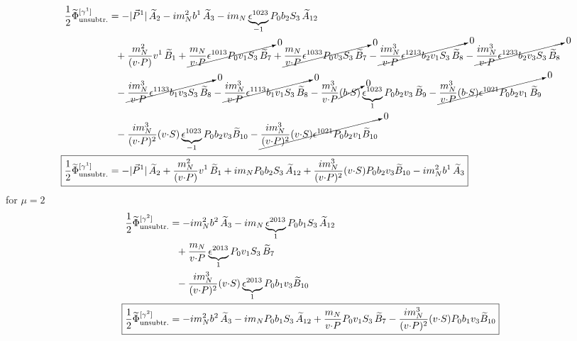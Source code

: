 \documentclass[]{article}
\numberwithin{equation}{section}
\newcommand{\tcdot}{{\cdot}}
\newcommand{\tAmp}{\widetilde{A}}
\newcommand{\tBmp}{\widetilde{B}}
\newcommand{\bvec}{b}
\newcommand{\mN}{m_N}
\newcommand{\unsub}{\text{unsubtr.}}
\begin{document}
\begin{align}
    \frac{1}{2}\widetilde \Phi^{[\gamma^{1}]}_{\unsub} & = 
		-|\vec{P}^1|\, \tAmp_2 - i \mN^2 \bvec^1\, \tAmp_3
		- i \mN \underbrace{\epsilon^{1 023}}_{-1} P_0 \bvec_2 S_3\, \tAmp_{12} \nonumber \\ &
		~~+ \frac{\mN^2}{(v \tcdot P)} v^1\, \tBmp_1 
		+ \cancelto{0}{\frac{\mN}{v \tcdot P} \epsilon^{1 013} P_0 v_1 S_3\, \tBmp_7  }+ \cancelto{0}{\frac{\mN}{v \tcdot P} \epsilon^{1 033} P_0 v_3 S_3\, \tBmp_7  }
		- \cancelto{0}{\frac{ i \mN^3}{v \tcdot P} \epsilon^{1 213} \bvec_2 v_1 S_3\, \tBmp_8}- \cancelto{0}{\frac{ i \mN^3}{v \tcdot P} \epsilon^{1 233} \bvec_2 v_3 S_3\, \tBmp_8} \nonumber \\ &
  ~~- \cancelto{0}{\frac{ i \mN^3}{v \tcdot P} \epsilon^{1 133} \bvec_1 v_3 S_3\, \tBmp_8}- \cancelto{0}{\frac{ i \mN^3}{v \tcdot P} \epsilon^{1 113} \bvec_1 v_1 S_3\, \tBmp_8}- \frac{\mN^3}{v \tcdot P} \cancelto{0}{(\bvec \tcdot S)} \underbrace{\epsilon^{1 023}}_{1} P_0 \bvec_2 v_3\, \tBmp_9- \cancelto{0}{\frac{\mN^3}{v \tcdot P} (\bvec \tcdot S) \epsilon^{1 021} P_0 \bvec_2 v_1\, \tBmp_9} \nonumber \\ &
		~~
		- \frac{i \mN^3}{(v \tcdot P)^2} (v \tcdot S) \underbrace{\epsilon^{1 023}}_{-1} P_0 \bvec_2 v_3 \tBmp_{10}- \cancelto{0}{\frac{i \mN^3}{(v \tcdot P)^2} (v \tcdot S) \epsilon^{1 021} P_0 \bvec_2 v_1 \tBmp_{10}}\\
  \Aboxed{ \frac{1}{2}\widetilde \Phi^{[\gamma^{1}]}_{\unsub} & =-|\vec{P}^1|\, \tAmp_2+ \frac{\mN^2}{(v \tcdot P)} v^1\, \tBmp_1 
		+ i \mN  P_0 \bvec_2 S_3\, \tAmp_{12}+ \frac{i \mN^3}{(v \tcdot P)^2} (v \tcdot S)  P_0 \bvec_2 v_3 \tBmp_{10}- i \mN^2 \bvec^1\, \tAmp_3}
\end{align}
for $\mu=2$
\begin{align}
    \frac{1}{2}\widetilde \Phi^{[\gamma^2]}_{\unsub} & = 
		 - i \mN^2 \bvec^2\, \tAmp_3
		- i \mN \underbrace{\epsilon^{2 0 1 3}}_{1} P_0 \bvec_1 S_3\, \tAmp_{12} \nonumber \\ &
		~~
		+ \frac{\mN}{v \tcdot P} \underbrace{\epsilon^{2 0 1 3}}_{1} P_0 v_1 S_3\, \tBmp_7  
		 \nonumber \\ &
		~~
		- \frac{i \mN^3}{(v \tcdot P)^2} (v \tcdot S) \underbrace{\epsilon^{2 0 1 3}}_{1} P_0 \bvec_1 v_3 \tBmp_{10}\\
  \Aboxed{\frac{1}{2}\widetilde \Phi^{[\gamma^2]}_{\unsub} & =- i \mN^2 \bvec^2\, \tAmp_3
		- i \mN  P_0 \bvec_1 S_3\, \tAmp_{12}+ \frac{\mN}{v \tcdot P}  P_0 v_1 S_3\, \tBmp_7- \frac{i \mN^3}{(v \tcdot P)^2} (v \tcdot S) P_0 \bvec_1 v_3 \tBmp_{10}}
\end{align}
\end{document}

